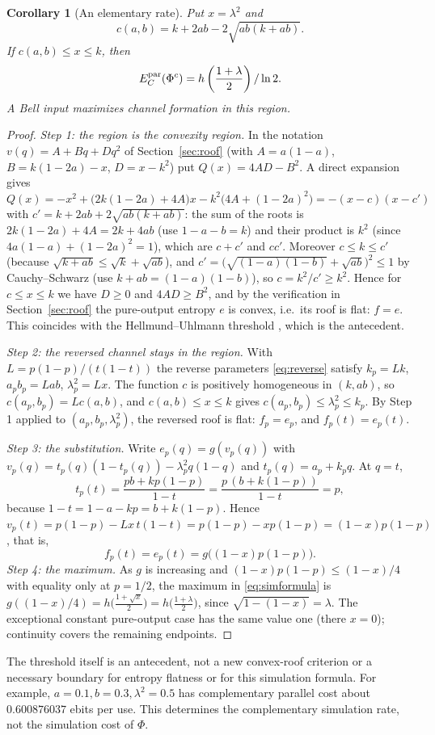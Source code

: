 \documentclass[11pt]{article}
\newtheorem{corollary}[theorem]{Corollary}
\begin{document}
\begin{corollary}[An elementary rate]\label{cor:closedcost}
Put $x=\lambda^2$ and
\[
 c(a,b)=k+2ab-2\sqrt{ab(k+ab)}.
\]
If $c(a,b)\le x\le k$, then
\[
 E_C^{\rm par}(\Phi^c)=h\left(\frac{1+\lambda}{2}\right)/\ln2.
\]
A Bell input maximizes channel formation in this region.
\end{corollary}
\begin{proof}
\emph{Step 1: the region is the convexity region.} In the notation $v(q)=A+Bq+Dq^2$ of Section~\ref{sec:roof} (with $A=a(1-a)$, $B=k(1-2a)-x$, $D=x-k^2$) put $Q(x)=4AD-B^2$. A direct expansion gives
$Q(x)=-x^2+\bigl(2k(1-2a)+4A\bigr)x-k^2\bigl(4A+(1-2a)^2\bigr)=-(x-c)(x-c')$ with
$c'=k+2ab+2\sqrt{ab(k+ab)}$: the sum of the roots is $2k(1-2a)+4A=2k+4ab$ (use $1-a-b=k$) and their product is $k^2$ (since $4a(1-a)+(1-2a)^2=1$), which are $c+c'$ and $cc'$. Moreover $c\le k\le c'$ (because $\sqrt{k+ab}\le\sqrt k+\sqrt{ab}$), and $c'=\bigl(\sqrt{(1-a)(1-b)}+\sqrt{ab}\bigr)^2\le1$ by Cauchy--Schwarz (use $k+ab=(1-a)(1-b)$), so $c=k^2/c'\ge k^2$. Hence for $c\le x\le k$ we have $D\ge0$ and $4AD\ge B^2$, and by the verification in Section~\ref{sec:roof} the pure-output entropy $e$ is convex, i.e.\ its roof is flat: $f=e$. This coincides with the Hellmund--Uhlmann threshold \cite[Equation (29) and Section V.B]{hu}, which is the antecedent.

\emph{Step 2: the reversed channel stays in the region.} With $L=p(1-p)/(t(1-t))$ the reverse parameters \eqref{eq:reverse} satisfy $k_p=Lk$, $a_pb_p=Lab$, $\lambda_p^2=Lx$. The function $c$ is positively homogeneous in $(k,ab)$, so $c(a_p,b_p)=Lc(a,b)$, and $c(a,b)\le x\le k$ gives $c(a_p,b_p)\le\lambda_p^2\le k_p$. By Step 1 applied to $(a_p,b_p,\lambda_p^2)$, the reversed roof is flat: $f_p=e_p$, and $f_p(t)=e_p(t)$.

\emph{Step 3: the substitution.} Write $e_p(q)=g(v_p(q))$ with $v_p(q)=t_p(q)(1-t_p(q))-\lambda_p^2q(1-q)$ and $t_p(q)=a_p+k_pq$. At $q=t$,
\[
 t_p(t)=\frac{pb+kp(1-p)}{1-t}=\frac{p\,(b+k(1-p))}{1-t}=p,
\]
because $1-t=1-a-kp=b+k(1-p)$. Hence $v_p(t)=p(1-p)-Lx\,t(1-t)=p(1-p)-xp(1-p)=(1-x)p(1-p)$, that is,
\[
 f_p(t)=e_p(t)=g\bigl((1-x)p(1-p)\bigr).
\]
\emph{Step 4: the maximum.} As $g$ is increasing and $(1-x)p(1-p)\le(1-x)/4$ with equality only at $p=1/2$, the maximum in \eqref{eq:simformula} is $g((1-x)/4)=h\bigl(\tfrac{1+\sqrt{x}}2\bigr)=h\bigl(\tfrac{1+\lambda}2\bigr)$, since $\sqrt{1-(1-x)}=\lambda$. The exceptional constant pure-output case has the same value one (there $x=0$); continuity covers the remaining
endpoints.
\end{proof}
The threshold itself is an antecedent, not a new convex-roof criterion or
a necessary boundary for entropy flatness or for this simulation formula.
For example, $a=0.1,b=0.3,\lambda^2=0.5$ has complementary parallel cost
about $0.600876037$ ebits per use. This determines the complementary
simulation rate, not the simulation cost of $\Phi$.
\end{document}
